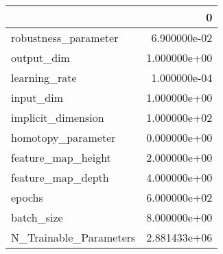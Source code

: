 \begin{tabular}{lr}
\toprule
{} &             0 \\
\midrule
robustness\_parameter   &  6.900000e-02 \\
output\_dim             &  1.000000e+00 \\
learning\_rate          &  1.000000e-04 \\
input\_dim              &  1.000000e+00 \\
implicit\_dimension     &  1.000000e+02 \\
homotopy\_parameter     &  0.000000e+00 \\
feature\_map\_height     &  2.000000e+00 \\
feature\_map\_depth      &  4.000000e+00 \\
epochs                 &  6.000000e+02 \\
batch\_size             &  8.000000e+00 \\
N\_Trainable\_Parameters &  2.881433e+06 \\
\bottomrule
\end{tabular}
